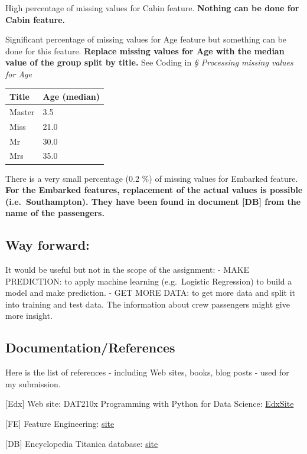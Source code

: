 \documentclass[11pt]{article}
\begin{document}
    High percentage of missing values for Cabin feature. \textbf{Nothing can
be done for Cabin feature.}

Significant percentage of missing values for Age feature but something
can be done for this feature. \textbf{Replace missing values for Age
with the median value of the group split by title.} See Coding in
\emph{§ Processing missing values for Age}

\begin{longtable}[]{@{}ll@{}}
\toprule
Title & Age (median)\tabularnewline
\midrule
\endhead
Master & 3.5\tabularnewline
Miss & 21.0\tabularnewline
Mr & 30.0\tabularnewline
Mrs & 35.0\tabularnewline
\bottomrule
\end{longtable}

There is a very small percentage (0.2 \%) of missing values for Embarked
feature. \textbf{For the Embarked features, replacement of the actual
values is possible (i.e.~Southampton). They have been found in document
{[}DB{]} from the name of the passengers.}

    \subsection{Way forward:}\label{way-forward}

It would be useful but not in the scope of the assignment: - MAKE
PREDICTION: to apply machine learning (e.g.~Logistic Regression) to
build a model and make prediction. - GET MORE DATA: to get more data and
split it into training and test data. The information about crew
passengers might give more insight.

    \subsection{Documentation/References}\label{documentationreferences}

Here is the list of references - including Web sites, books, blog posts
- used for my submission.

{[}Edx{]} Web site: DAT210x Programming with Python for Data Science:
\href{https://courses.edx.org/courses/course-v1:Microsoft+DAT210x+2T2017/info}{EdxSite}

{[}FE{]} Feature Engineering:
\href{https://triangleinequality.wordpress.com/2013/09/08/basic-feature-engineering-with-the-titanic-data/5}{site}

{[}DB{]} Encyclopedia Titanica database:
\href{https://www.encyclopedia-titanica.org/}{site}
\end{document}
